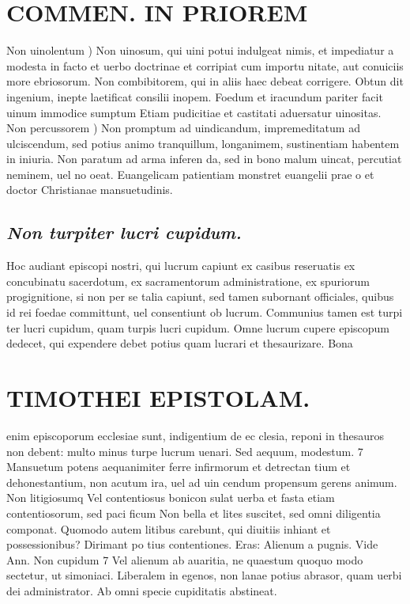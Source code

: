 \documentclass{article}
\begin{document}
\begin{pages}
\section*{COMMEN. IN PRIOREM }
\marginpar{[ p.76 ]}\pstart Non uinolentum ) Non uinosum, qui uini potui indulgeat nimis, et impediatur a modesta in facto et uerbo doctrinae et corripiat cum importu nitate, aut conuiciis more ebriosorum. Non combibitorem, qui in aliis haec debeat corrigere. Obtun dit ingenium, inepte laetificat consilii inopem. Foedum et iracundum pariter facit uinum immodice sumptum Etiam pudicitiae et castitati aduersatur uinositas.  \pend\pstart Non percussorem ) Non promptum ad uindicandum, impremeditatum ad ulciscendum, sed potius animo tranquillum, longanimem, sustinentiam habentem in iniuria. Non paratum ad arma inferen da, sed in bono malum uincat, percutiat neminem, uel no oeat. Euangelicam patientiam monstret euangelii prae o et doctor Christianae mansuetudinis.  \pend
{}
{}
\subsection*{\textit{Non turpiter lucri cupidum. }}\pstart Hoc audiant episcopi nostri, qui lucrum capiunt ex casibus reseruatis ex concubinatu sacerdotum, ex sacramentorum administratione, ex spuriorum progignitione, si non per se talia capiunt, sed tamen subornant officiales, quibus id rei foedae committunt, uel consentiunt ob lucrum. Communius tamen est turpi ter lucri cupidum, quam turpis lucri cupidum. Omne lucrum cupere episcopum dedecet, qui expendere debet potius quam lucrari et thesaurizare. Bona  \pend
\section*{TIMOTHEI EPISTOLAM. }
\marginpar{[ p.77 ]}\pstart enim episcoporum ecclesiae sunt, indigentium de ec clesia, reponi in thesauros non debent: multo minus turpe lucrum uenari.  \pend\pstart Sed aequum, modestum. 7 Mansuetum potens aequanimiter ferre infirmorum et detrectan tium et dehonestantium, non acutum ira, uel ad uin cendum propensum gerens animum.  \pend\pstart Non litigiosumq Vel contentiosus bonicon sulat uerba et fasta etiam contentiosorum, sed paci ficum Non bella et lites suscitet, sed omni diligentia componat. Quomodo autem litibus carebunt, qui diuitiis inhiant et possessionibus? Dirimant po tius contentiones. Eras: Alienum a pugnis. Vide Ann. Non cupidum 7 Vel alienum ab auaritia, ne quaestum quoquo modo sectetur, ut simoniaci. Liberalem in egenos, non lanae potius abrasor, quam uerbi dei administrator. Ab omni specie cupiditatis abstineat.  \pend
{}
{}

\end{pages}
\end{document}
